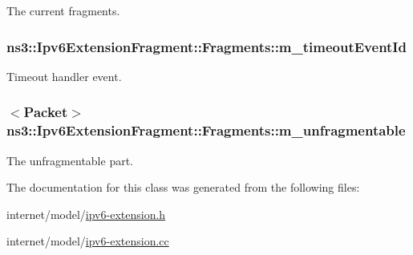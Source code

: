 The current fragments. 

\subsubsection[{\texorpdfstring{m\+\_\+timeout\+Event\+Id}{m_timeoutEventId}}]{ ns3\+::\+Ipv6\+Extension\+Fragment\+::\+Fragments\+::m\+\_\+timeout\+Event\+Id\hspace{0.3cm}{\ttfamily [private]}}\hypertarget{classns3_1_1Ipv6ExtensionFragment_1_1Fragments_a5a2c426ed3fed107b7aa774a2f277600}{}\label{classns3_1_1Ipv6ExtensionFragment_1_1Fragments_a5a2c426ed3fed107b7aa774a2f277600}


Timeout handler event. 

\subsubsection[{\texorpdfstring{m\+\_\+unfragmentable}{m_unfragmentable}}]{$<${\bf Packet}$>$ ns3\+::\+Ipv6\+Extension\+Fragment\+::\+Fragments\+::m\+\_\+unfragmentable\hspace{0.3cm}{\ttfamily [private]}}\hypertarget{classns3_1_1Ipv6ExtensionFragment_1_1Fragments_a984aec2a43c2fb5a909637fc25ace14d}{}\label{classns3_1_1Ipv6ExtensionFragment_1_1Fragments_a984aec2a43c2fb5a909637fc25ace14d}


The unfragmentable part. 



The documentation for this class was generated from the following files\+:\begin{DoxyCompactItemize}
\item 
internet/model/\hyperlink{ipv6-extension_8h}{ipv6-\/extension.\+h}\item 
internet/model/\hyperlink{ipv6-extension_8cc}{ipv6-\/extension.\+cc}\end{DoxyCompactItemize}
